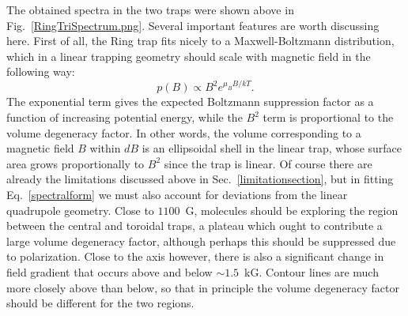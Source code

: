 \documentclass[defaultstyle,11pt]{thesis}
\begin{document}
The obtained spectra in the two traps were shown above in Fig.~\ref{RingTriSpectrum.png}.
Several important features are worth discussing here.
First of all, the Ring trap fits nicely to a Maxwell-Boltzmann distribution, which in a linear trapping geometry should scale with magnetic field in the following way:
\begin{equation}
\label{spectralform}
p(B)\propto B^2e^{\mu_B B/kT}.
\end{equation}
The exponential term gives the expected Boltzmann suppression factor as a function of increasing potential energy, while the $B^2$ term is proportional to the volume degeneracy factor.
In other words, the volume corresponding to a magnetic field $B$ within $dB$ is an ellipsoidal shell in the linear trap, whose surface area grows proportionally to $B^2$ since the trap is linear.
Of course there are already the limitations discussed above in Sec.~\ref{limitationsection}, but in fitting Eq.~\ref{spectralform} we must also account for deviations from the linear quadrupole geometry.
Close to $1100$~G, molecules should be exploring the region between the central and toroidal traps, a plateau which ought to contribute a large volume degeneracy factor, although perhaps this should be suppressed due to polarization.
Close to the axis however, there is also a significant change in field gradient that occurs above and below $\sim1.5$~kG. Contour lines are much more closely above  than below, so that in principle the volume degeneracy factor should be different for the two regions.
\end{document}
